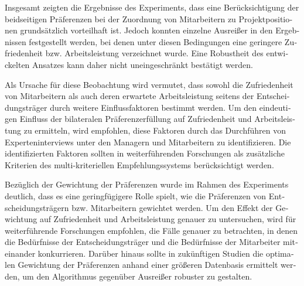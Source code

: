 \begin{otherlanguage}{ngerman}
Insgesamt zeigten die Ergebnisse des Experiments, dass eine Berücksichtigung der beidseitigen Präferenzen bei der Zuordnung von Mitarbeitern zu Projektpositionen grundsätzlich vorteilhaft ist.
Jedoch konnten einzelne Ausreißer in den Ergebnissen festgestellt werden, bei denen unter diesen Bedingungen eine geringere Zufriedenheit bzw. Arbeitsleistung verzeichnet wurde.
Eine Robustheit des entwickelten Ansatzes kann daher nicht uneingeschränkt bestätigt werden.

Als Ursache für diese Beobachtung wird vermutet, dass sowohl die Zufriedenheit von Mitarbeitern als auch deren erwartete Arbeitsleistung seitens der Entscheidungsträger durch weitere Einflussfaktoren bestimmt werden.
Um den eindeutigen Einfluss der bilateralen Präferenzerfüllung auf Zufriedenheit und Arbeitsleistung zu ermitteln, wird empfohlen, diese Faktoren durch das Durchführen von Experteninterviews unter den Managern und Mitarbeitern zu identifizieren.
Die identifizierten Faktoren sollten in weiterführenden Forschungen als zusätzliche Kriterien des multi-kriteriellen Empfehlungssystems berücksichtigt werden.

Bezüglich der Gewichtung der Präferenzen wurde im Rahmen des Experiments deutlich, dass es eine geringfügigere Rolle spielt, wie die Präferenzen von Entscheidungsträgern bzw. Mitarbeitern gewichtet werden.
Um den Effekt der Gewichtung auf Zufriedenheit und Arbeitsleistung genauer zu untersuchen, wird für weiterführende Forschungen empfohlen, die Fälle genauer zu betrachten, in denen die Bedürfnisse der Entscheidungsträger und die Bedürfnisse der Mitarbeiter miteinander konkurrieren.
Darüber hinaus sollte in zukünftigen Studien die optimalen Gewichtung der Präferenzen anhand einer größeren Datenbasis ermittelt werden, um den Algorithmus gegenüber Ausreißer robuster zu gestalten.

\end{otherlanguage}
